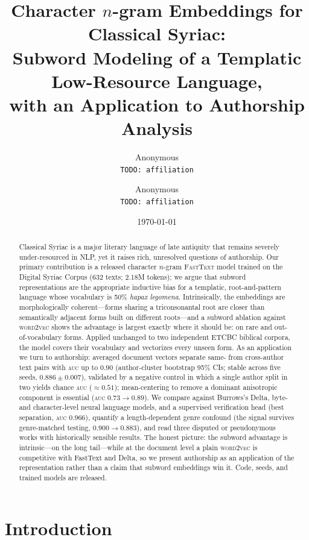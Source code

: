\documentclass[11pt]{article}
\title{Character $n$-gram Embeddings for Classical Syriac:\\
Subword Modeling of a Templatic Low-Resource Language,\\
with an Application to Authorship Analysis}
\author{Anonymous\\ \texttt{TODO: affiliation} \and Anonymous\\ \texttt{TODO: affiliation}}
\date{\today}
\newcommand{\auc}{\textsc{auc}}
\newcommand{\auc}{\textsc{auc}}
\begin{document}
\maketitle

\begin{abstract}
Classical Syriac is a major literary language of late antiquity that remains
severely under-resourced in NLP, yet it raises rich, unresolved questions of
authorship. Our primary contribution is a released character $n$-gram
\textsc{FastText} model trained on the Digital Syriac Corpus (632 texts; 2.18M
tokens); we argue that subword representations are the appropriate inductive bias
for a templatic, root-and-pattern language whose vocabulary is 50\% \emph{hapax
legomena}. Intrinsically, the embeddings are morphologically coherent---forms
sharing a triconsonantal root are closer than semantically adjacent forms built
on different roots---and a subword ablation against \textsc{word2vec} shows the
advantage is largest exactly where it should be: on rare and out-of-vocabulary
forms. Applied unchanged to two independent ETCBC biblical corpora, the model
covers their vocabulary and vectorizes every unseen form. As an application we
turn to authorship: averaged document vectors separate same- from cross-author
text pairs with \auc{} up to $0.90$ (author-cluster bootstrap 95\% CIs; stable
across five seeds, $0.886\pm0.007$), validated by a negative control in which a
single author split in two yields chance \auc{} ($\approx 0.51$); mean-centering
to remove a dominant anisotropic component is essential (\auc{} $0.73\to0.89$). We
compare against Burrows's Delta, byte- and character-level neural language models,
and a supervised verification head (best separation, \auc{} $0.966$), quantify a
length-dependent genre confound (the signal survives genre-matched testing,
$0.900\to0.883$), and read three disputed or pseudonymous works with historically
sensible results. The honest
picture: the subword advantage is intrinsic---on the long tail---while at the
document level a plain \textsc{word2vec} is competitive with FastText and Delta,
so we present authorship as an application of the representation rather than a
claim that subword embeddings win it. Code, seeds, and trained models are
released.
\end{abstract}

\section{Introduction}
\label{sec:intro}
\end{document}
